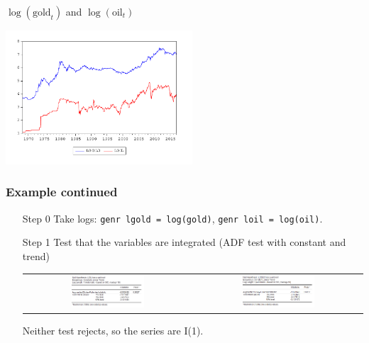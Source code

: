 \begin{frame}
\begin{block}{$\log(\mathrm{gold}_t)$ and $\log(\mathrm{oil}_t)$}
\begin{center}\includegraphics[height=5cm]{oilgold2017}\end{center}
\end{block}
\end{frame}
\begin{frame}\frametitle{Example continued}
\begin{itemize}
\item[Step 0] Take logs: \texttt{genr lgold = log(gold)}, \texttt{genr loil = log(oil)}.
\item[Step 1] Test that the variables are integrated (ADF test with constant and trend)
\begin{center}
\begin{tabular}{cc}
\includegraphics[width=0.45\textwidth]{ADF_loil} & \includegraphics[width=0.45\textwidth]{ADF_lgold}
\end{tabular}
\end{center}
Neither test rejects, so the series are I(1).
\end{itemize}
\end{frame}
